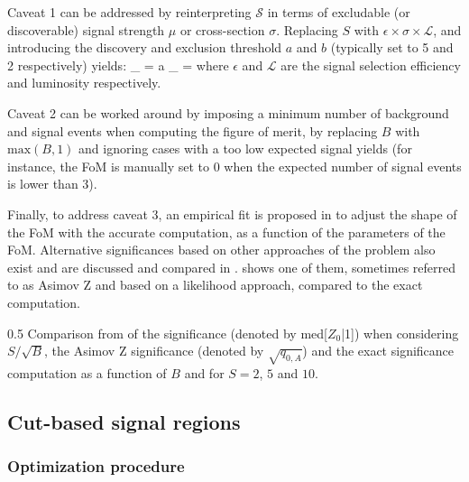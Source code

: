     Caveat 1 can be addressed by reinterpreting $\mathcal{S}$ in terms of excludable
    (or discoverable) signal strength $\mu$ or cross-section $\sigma$. Replacing
    $S$ with $\epsilon \times \sigma \times \mathcal{L}$, and introducing the discovery
    and exclusion threshold $a$ and $b$ (typically set to 5 and 2 respectively) yields:
    {
        \mathcal{\sigma}_ = a \cdot {}
       \hspace*{2cm}
       \mathcal{\sigma}_ =  \times {}
   }
    where $\epsilon$ and $\mathcal{L}$ are the signal selection efficiency and luminosity respectively.

    Caveat 2 can be worked around by imposing a minimum number of background and signal
    events when computing the figure of merit, by replacing $B$ with $\text{max}(B,1)$
    and ignoring cases with a too low expected signal yields (for instance, the FoM is
    manually set to 0 when the expected number of signal events is lower than 3).

    Finally, to address caveat 3, an empirical fit is proposed in \cite{Punzi} to adjust the
    shape of the FoM with the accurate computation, as a function of the parameters
    of the FoM. Alternative significances based on other approaches of the problem also
    exist and are discussed and compared in \cite{FOMCousins, FOMLinnemann, FOMCowan}.
     shows one of them, sometimes referred to as Asimov Z and based on a
    likelihood approach, compared to the exact computation.

                 {0.5}
                 {Comparison from \cite{FOMCowan} of the significance (denoted by med[$Z_0$|1])
                 when considering $S/\sqrt{B}$, the Asimov Z significance (denoted by $\sqrt{q_{0,A}}$) and
                 the exact significance computation as a function of $B$ and for $S = 2$, $5$ and $10$.}

        \subsection{Cut-based signal regions}

            \subsubsection{Optimization procedure}

